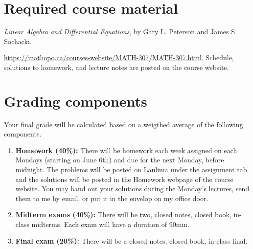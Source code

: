 \documentclass[12pt]{amsart}
\begin{document}
\section*{Required course material}

 \emph{Linear Algebra and Differential Equations}, by Gary L. Peterson and James S. Sochacki. %

 \url{https://mathopo.ca/courses-website/MATH-307/MATH-307.html}. Schedule, solutions to homework, and lecture notes are posted on the course website.



\section*{Grading components}
Your final grade will be calculated based on a weigthed average of the following components.
\begin{enumerate}
\item{\bf Homework (40\%):} There will be homework each week assigned on each Mondays (starting on June 6th) and due for the next Monday, before midnight. The problems will be posted on Laulima under the assignment tab and the solutions will be posted in the Homework webpage of the course website. You may hand out your solutions during the Monday's lectures, send them to me by email, or put it in the envelop on my office door.
\item {\bf Midterm exams (40\%):} There will be two, closed notes, closed book, in-class midterms. Each exam will have a duration of 90min.
\item {\bf Final exam (20\%):} There will be a closed notes, closed book, in-class final.
\end{enumerate}

\end{document}

